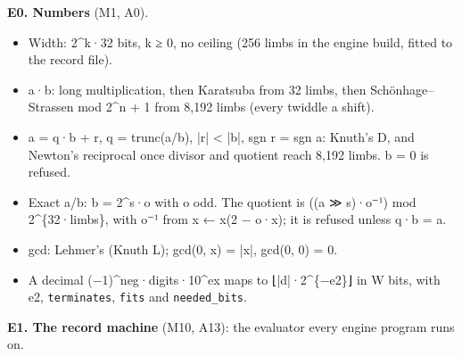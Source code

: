 \textbf{E0. Numbers} (M1, A0).

\begin{itemize}
\item Width: 2\textasciicircum{}k·32 bits, k ≥ 0, no ceiling (256 limbs in the engine build, fitted to the record file).
\item a·b: long multiplication, then Karatsuba from 32 limbs, then Schönhage–Strassen mod 2\textasciicircum{}n + 1 from 8,192 limbs (every twiddle a shift).
\item a = q·b + r, q = trunc(a/b), |r| < |b|, sgn r = sgn a: Knuth's D, and Newton's reciprocal once divisor and quotient reach 8,192 limbs. b = 0 is refused.
\item Exact a/b: b = 2\textasciicircum{}s·o with o odd. The quotient is ((a ≫ s)·o⁻¹) mod 2\textasciicircum{}\{32·limbs\}, with o⁻¹ from x ← x(2 − o·x); it is refused unless q·b = a.
\item gcd: Lehmer's (Knuth L); gcd(0, x) = |x|, gcd(0, 0) = 0.
\item A decimal (−1)\textasciicircum{}neg·digits·10\textasciicircum{}ex maps to ⌊|d|·2\textasciicircum{}\{−e2\}⌋ in W bits, with e2, \texttt{terminates}, \texttt{fits} and \texttt{needed\_\allowbreak{}bits}.
\end{itemize}

\textbf{E1. The record machine} (M10, A13): the evaluator every engine program runs on.

